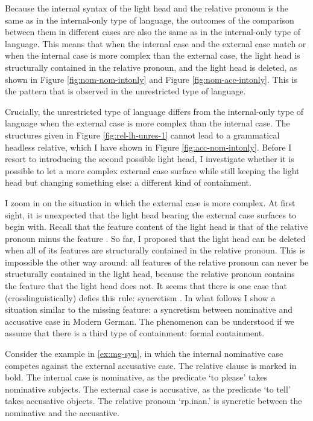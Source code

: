 Because the internal syntax of the light head and the relative pronoun is the same as in the internal-only type of language, the outcomes of the comparison between them in different cases are also the same as in the internal-only type of language. This means that when the internal case and the external case match or when the internal case is more complex than the external case, the light head is structurally contained in the relative pronoun, and the light head is deleted, as shown in Figure \ref{fig:nom-nom-intonly} and Figure \ref{fig:nom-acc-intonly}. This is the pattern that is observed in the unrestricted type of language.

Crucially, the unrestricted type of language differs from the internal-only type of language when the external case is more complex than the internal case. The structures given in Figure \ref{fig:rel-lh-unres-1} cannot lead to a grammatical headless relative, which I have shown in Figure \ref{fig:acc-nom-intonly}. Before I resort to introducing the second possible light head, I investigate whether it is possible to let a more complex external case surface while still keeping the light head but changing something else: a different kind of containment.

I zoom in on the situation in which the external case is more complex.
At first sight, it is unexpected that the light head bearing the external case surfaces to begin with. Recall that the feature content of the light head is that of the relative pronoun minus the feature .
So far, I proposed that the light head can be deleted when all of its features are structurally contained in the relative pronoun. This is impossible the other way around: all features of the relative pronoun can never be structurally contained in the light head, because the relative pronoun contains the feature  that the light head does not. It seems that there is one case that (crosslinguistically) defies this rule: syncretism \citep[cf.]{groos1981,dyta1984,zaenen1984,pullum1986,ingria1990,dalrymple2000,sag2003}.
In what follows I show a situation similar to the missing  feature: a syncretism between nominative and accusative case in Modern German.
The phenomenon can be understood if we assume that there is a third type of containment: formal containment.

Consider the example in \ref{ex:mg-syn}, in which the internal nominative case competes against the external accusative case. The relative clause is marked in bold.
The internal case is nominative, as the predicate  `to please' takes nominative subjects.
The external case is accusative, as the predicate  `to tell' takes accusative objects.
The relative pronoun  `\ac{rp}.\ac{inan}.' is syncretic between the nominative and the accusative.

